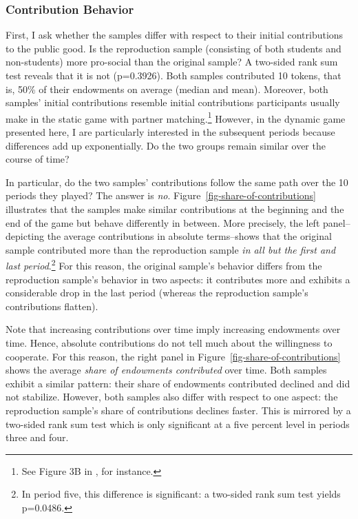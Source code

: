 \documentclass[
  authoryear,
  preprint,
  3p]{elsarticle}
\begin{document}
\hypertarget{sec-contributions}{%
\subsubsection{Contribution Behavior}\label{sec-contributions}}

First, I ask whether the samples differ with respect to their initial
contributions to the public good. Is the reproduction sample (consisting
of both students and non-students) more pro-social than the original
sample? A two-sided rank sum test reveals that it is not (p=0.3926).
Both samples contributed 10 tokens, that is, 50\% of their endowments on
average (median and mean). Moreover, both samples' initial contributions
resemble initial contributions participants usually make in the static
game with partner matching.\footnote{See Figure 3B in
  \citet[p.989]{fehrgaechter2000}, for instance.} However, in the
dynamic game presented here, I are particularly interested in the
subsequent periods because differences add up exponentially. Do the two
groups remain similar over the course of time?

In particular, do the two samples' contributions follow the same path
over the 10 periods they played? The answer is \emph{no}.
Figure~\ref{fig-share-of-contributions} illustrates that the samples
make similar contributions at the beginning and the end of the game but
behave differently in between. More precisely, the left panel--depicting
the average contributions in absolute terms--shows that the original
sample contributed more than the reproduction sample \emph{in all but
the first and last period}.\footnote{In period five, this difference is
  significant: a two-sided rank sum test yields p=0.0486.} For this
reason, the original sample's behavior differs from the reproduction
sample's behavior in two aspects: it contributes more and exhibits a
considerable drop in the last period (whereas the reproduction sample's
contributions flatten).

Note that increasing contributions over time imply increasing endowments
over time. Hence, absolute contributions do not tell much about the
willingness to cooperate. For this reason, the right panel in
Figure~\ref{fig-share-of-contributions} shows the average \emph{share of
endowments contributed} over time. Both samples exhibit a similar
pattern: their share of endowments contributed declined and did not
stabilize. However, both samples also differ with respect to one aspect:
the reproduction sample's share of contributions declines faster. This
is mirrored by a two-sided rank sum test which is only significant at a
five percent level in periods three and four.
\end{document}
